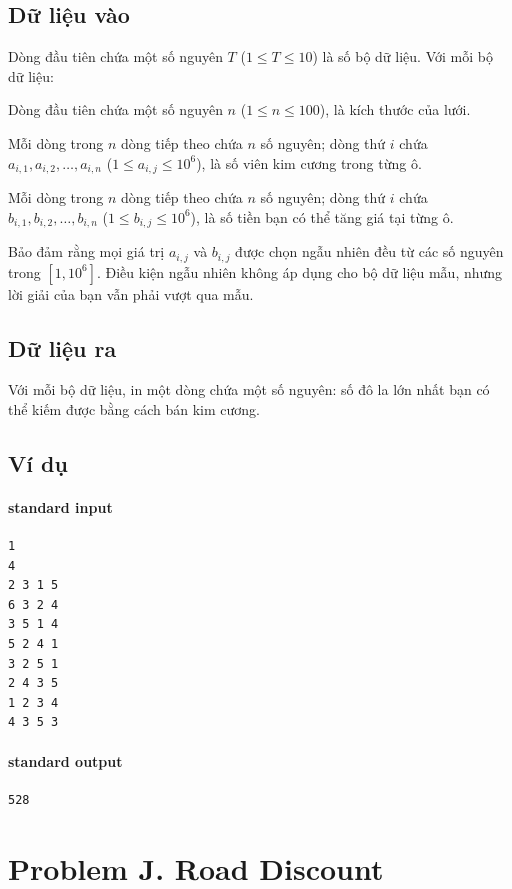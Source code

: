 \documentclass[11pt]{article}
\begin{document}
\subsection*{Dữ liệu vào}

Dòng đầu tiên chứa một số nguyên \(T\) (\(1\le T\le 10\)) là số bộ dữ liệu.
Với mỗi bộ dữ liệu:

Dòng đầu tiên chứa một số nguyên \(n\) (\(1\le n\le 100\)), là kích thước
của lưới.

Mỗi dòng trong \(n\) dòng tiếp theo chứa \(n\) số nguyên; dòng thứ \(i\) chứa
\(a_{i,1},a_{i,2},\ldots,a_{i,n}\) (\(1\le a_{i,j}\le 10^6\)), là số viên
kim cương trong từng ô.

Mỗi dòng trong \(n\) dòng tiếp theo chứa \(n\) số nguyên; dòng thứ \(i\) chứa
\(b_{i,1},b_{i,2},\ldots,b_{i,n}\) (\(1\le b_{i,j}\le 10^6\)), là số tiền
bạn có thể tăng giá tại từng ô.

Bảo đảm rằng mọi giá trị \(a_{i,j}\) và \(b_{i,j}\) được chọn ngẫu nhiên đều
từ các số nguyên trong \([1,10^6]\). Điều kiện ngẫu nhiên không áp dụng cho
bộ dữ liệu mẫu, nhưng lời giải của bạn vẫn phải vượt qua mẫu.

\subsection*{Dữ liệu ra}

Với mỗi bộ dữ liệu, in một dòng chứa một số nguyên: số đô la lớn nhất bạn có
thể kiếm được bằng cách bán kim cương.

\subsection*{Ví dụ}

\paragraph{standard input}
\begin{verbatim}
1
4
2 3 1 5
6 3 2 4
3 5 1 4
5 2 4 1
3 2 5 1
2 4 3 5
1 2 3 4
4 3 5 3
\end{verbatim}

\paragraph{standard output}
\begin{verbatim}
528
\end{verbatim}

\section{Problem J. Road Discount}
\end{document}
